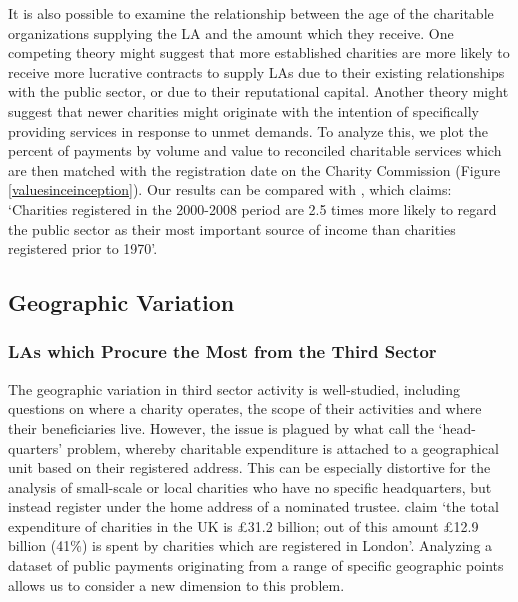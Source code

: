 \documentclass[11pt]{article}
\begin{document}
It is also possible to examine the relationship between the age of the charitable organizations supplying the LA and the amount which they receive. One competing theory might suggest that more established charities are more likely to receive more lucrative contracts to supply LAs due to their existing relationships with the public sector, or due to their reputational capital. Another theory might suggest that newer charities might originate with the intention of specifically providing services in response to unmet demands. To analyze this, we plot the percent of payments by volume and value to reconciled charitable services which are then matched with the registration date on the Charity Commission (Figure \ref{valuesinceinception}). Our results can be compared with \cite[p.11]{cliffordfreidamohan2010}, which claims: `Charities registered in the 2000-2008 period are 2.5 times more likely to regard the public sector as their most important source of income than charities registered prior to 1970'.

\subsection{Geographic Variation}

\subsubsection{LAs which Procure the Most from the Third Sector}

The geographic variation in third sector activity is well-studied, including questions on where a charity operates, the scope of their activities and where their beneficiaries live. However, the issue is plagued by what \cite{kane2009} call the ‘head-quarters’ problem, whereby charitable expenditure is attached to a geographical unit based on their registered address. This can be especially distortive for the analysis of small-scale or local charities who have no specific headquarters, but instead register under the home address of a nominated trustee. \cite{kane2009} claim ‘the total expenditure of charities in the UK is £31.2 billion; out of this amount £12.9 billion (41\%) is spent by charities which are registered in London’. Analyzing a dataset of public payments originating from a range of specific geographic points allows us to consider a new dimension to this problem.
\end{document}
